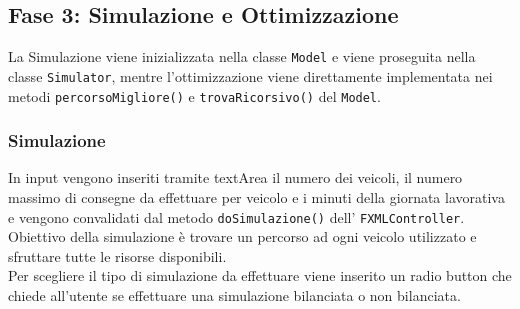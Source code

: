 \documentclass[a4paper,12pt]{report}
\begin{document}
\subsection{Fase 3: Simulazione e Ottimizzazione}
La Simulazione viene inizializzata nella classe \texttt{Model} e viene proseguita nella classe \texttt{Simulator},
mentre l'ottimizzazione viene direttamente implementata nei metodi \texttt{percorsoMigliore()} e \texttt{trovaRicorsivo()}
del \texttt{Model}.
\subsubsection{Simulazione}
In input vengono inseriti tramite textArea il numero dei veicoli, il numero massimo di consegne da effettuare per veicolo e
i minuti della giornata lavorativa e vengono convalidati dal metodo \texttt{doSimulazione()} dell' \texttt{FXMLController}.\\
Obiettivo della simulazione è trovare un percorso ad ogni veicolo utilizzato e sfruttare tutte
le risorse disponibili. \\
Per scegliere il tipo di simulazione da effettuare viene inserito un radio button che chiede
all'utente se effettuare una simulazione bilanciata o non bilanciata.
\end{document}
